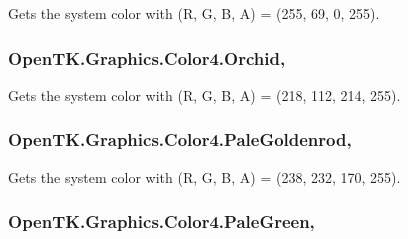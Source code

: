 Gets the system color with (R, G, B, A) = (255, 69, 0, 255). 

\hypertarget{struct_open_t_k_1_1_graphics_1_1_color4_a2293a6b66b9236e63174f13343a32787}{
\subsubsection[{Orchid}]{ Open\-T\-K.\-Graphics.\-Color4.\-Orchid\hspace{0.3cm}{\ttfamily [static]}, {\ttfamily [get]}}}\label{struct_open_t_k_1_1_graphics_1_1_color4_a2293a6b66b9236e63174f13343a32787}


Gets the system color with (R, G, B, A) = (218, 112, 214, 255). 

\hypertarget{struct_open_t_k_1_1_graphics_1_1_color4_a6862037b256b45b818443769578dd941}{
\subsubsection[{Pale\-Goldenrod}]{ Open\-T\-K.\-Graphics.\-Color4.\-Pale\-Goldenrod\hspace{0.3cm}{\ttfamily [static]}, {\ttfamily [get]}}}\label{struct_open_t_k_1_1_graphics_1_1_color4_a6862037b256b45b818443769578dd941}


Gets the system color with (R, G, B, A) = (238, 232, 170, 255). 

\hypertarget{struct_open_t_k_1_1_graphics_1_1_color4_a942e28da2ed49feea8d2b034d76d8f84}{
\subsubsection[{Pale\-Green}]{ Open\-T\-K.\-Graphics.\-Color4.\-Pale\-Green\hspace{0.3cm}{\ttfamily [static]}, {\ttfamily [get]}}}\label{struct_open_t_k_1_1_graphics_1_1_color4_a942e28da2ed49feea8d2b034d76d8f84}


